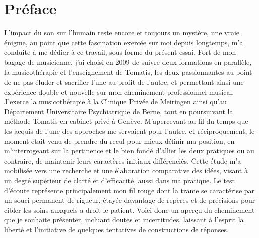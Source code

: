 \chapter*{Préface}
 L'impact du son sur l'humain reste encore et toujours un mystère, une vraie énigme, au point que cette  
 fascination exercée  sur moi depuis longtemps, m'a conduite à me dédier à ce travail, sous forme du 
 présent essai.
 Fort de mon bagage de musicienne, j'ai choisi en 2009  de suivre deux formations en parallèle,  
 la musicothérapie et l'enseignement de  Tomatis, les deux passionnantes au point de ne pas éluder et 
 sacrifier l'une au profit de l'autre, et permettant ainsi une expérience double et nouvelle sur mon 
 cheminement professionnel musical.
 J'exerce  la musicothérapie à la Clinique Privée de Meiringen ainsi qu'au 
 Département 
 Universitaire Psychiatrique de Berne, tout en poursuivant  la méthode 
 Tomatis en cabinet privé à Genève. M'apercevant au fil du temps que les 
 acquis de l'une des approches me servaient  pour l'autre, et réciproquement, le moment était venu de 
 prendre du recul pour mieux 
 définir ma position, en  m'interrogeant  sur la pertinence et le bien fondé d'allier les deux pratiques 
 ou au contraire, de maintenir  leurs caractères initiaux différenciés.  Cette étude m'a mobilisée vers une 
 recherche et une élaboration comparative  des idées, visant à un degré supérieur de clarté et d'efficacité, 
 aussi dans ma pratique.
 Le test d'écoute représente principalement mon fil rouge dont la trame se caractérise par un souci 
 permanent de rigueur, étayée davantage de repères et de précisions  pour cibler les 
 soins auxquels a droit le patient.
 Voici donc un aperçu du cheminement que je souhaite présenter, incluant doutes et incertitudes,
  laissant à l'esprit la liberté et l'initiative de quelques tentatives de constructions de réponses.

